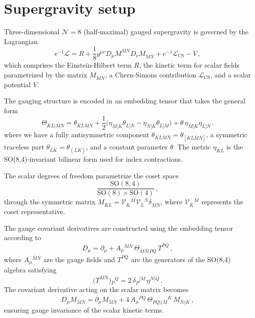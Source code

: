 \documentclass[11pt]{article}
\newcommand{\bK}{{\bar{K}}}
\newcommand{\bL}{{\bar{L}}}
\newcommand{\bM}{{\bar{M}}}
\newcommand{\bN}{{\bar{N}}}
\newcommand{\bP}{{\bar{P}}}
\newcommand{\bQ}{{\bar{Q}}}
\begin{document}
\section{Supergravity setup}
	
Three-dimensional $\mathcal{N}=8$ (half-maximal) gauged supergravity is governed by the Lagrangian
%
\begin{equation}	\label{eq: lagrangian_rephrased} 
	e^{-1}\mathcal{L}=R+\frac1{8}g^{\mu\nu}D_\mu M^{\bM\bN}D_\nu M_{\bM\bN}+e^{-1}\mathcal{L}_{\text{CS}}-V\,,
\end{equation}
%
which comprises the Einstein-Hilbert term $R$, the kinetic term for scalar fields parametrized by the matrix $M_{\bM\bN}$, a Chern-Simons contribution $\mathcal{L}_{\text{CS}}$, and a scalar potential $V$.

The gauging structure is encoded in an embedding tensor that takes the general form
%
\begin{equation}	\label{eq: embtensor_rephrased}
	\Theta_{\bK\bL\vert\bM\bN}=\theta_{\bK\bL\bM\bN}+\frac12\Big(\eta_{\bM[\bK}\theta_{\bL]\bN}-\eta_{\bN[\bK}\theta_{\bL]\bM}\Big)+\theta\,\eta_{\bM[\bK}\eta_{\bL]\bN}\,.
\end{equation}
%
where we have a fully antisymmetric component $\theta_{\bK\bL\bM\bN}=\theta_{[\bK\bL\bM\bN]}$, a symmetric traceless part $\theta_{\bL\bK}=\theta_{(\bL\bK)}$, and a constant parameter $\theta$. The metric $\eta_{\bK\bL}$ is the SO(8,4)-invariant bilinear form used for index contractions.

The scalar degrees of freedom parametrize the coset space
%
\begin{equation}	\label{eq: scalarcoset_rephrased}
	\frac{\text{SO}(8,4)}{\text{SO}(8)\times\text{SO}(4)}\,,
\end{equation}
%
through the symmetric matrix $M_{\bK\bL}=\mathcal{V}_{\bK}{}^{\bM}\mathcal{V}_{\bL}{}^{\bN}\delta_{\bM\bN}$, where $\mathcal{V}_{\bK}{}^{\bM}$ represents the coset representative. 

The gauge covariant derivatives are constructed using the embedding tensor according to
%
\begin{equation}
	D_\mu =\partial_\mu + A_\mu{}^{\bM\bN}\,\Theta_{\bM\bN\vert\bP\bQ}\, T^{\bP\bQ}\,,
\end{equation}
%
where $A_\mu{}^{\bM\bN}$ are the gauge fields and $T^{\bP\bQ}$ are the generators of the SO(8,4) algebra satisfying
%
\begin{equation} \label{eq:so84gen_rephrased}
	\big(T^{\bar M\bar N}\big){}_{\bar P}{}^{\bar Q} = 2\,\delta_{\bar P}{}^{[\bar M}\,\eta^{\bar N]\bar Q}\,.
\end{equation}
%
The covariant derivative acting on the scalar matrix becomes
%
\begin{equation}
	D_\mu M_{\bM\bN}=\partial_\mu M_{\bM\bN}+4\,A_\mu{}^{\bP\bQ}\,\Theta_{\bP\bQ\vert(\bM}{}^{\bK}\, M_{\bN)\bK}\,,
\end{equation}
%
ensuring gauge invariance of the scalar kinetic terms.
\end{document}
